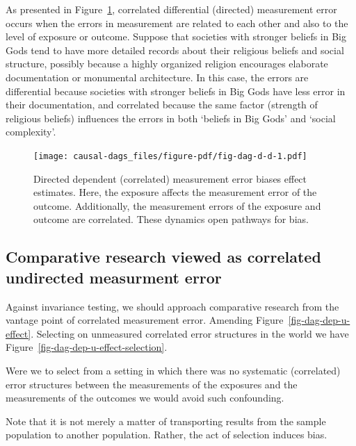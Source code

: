 \documentclass[
  singlecolumn]{report}
\begin{document}
As presented in Figure~\ref{fig-dag-d-d}, correlated differential
(directed) measurement error occurs when the errors in measurement are
related to each other and also to the level of exposure or outcome.
Suppose that societies with stronger beliefs in Big Gods tend to have
more detailed records about their religious beliefs and social
structure, possibly because a highly organized religion encourages
elaborate documentation or monumental architecture. In this case, the
errors are differential because societies with stronger beliefs in Big
Gods have less error in their documentation, and correlated because the
same factor (strength of religious beliefs) influences the errors in
both `beliefs in Big Gods' and `social complexity'.

\begin{figure}

{\centering \texttt{[image: causal-dags\_files/figure-pdf/fig-dag-d-d-1.pdf]}

}

\caption{\label{fig-dag-d-d}Directed dependent (correlated) measurement
error biases effect estimates. Here, the exposure affects the
measurement error of the outcome. Additionally, the measurement errors
of the exposure and outcome are correlated. These dynamics open pathways
for bias.}

\end{figure}

\hypertarget{comparative-research-viewed-as-correlated-undirected-measurment-error}{%
\subsection{Comparative research viewed as correlated undirected
measurment
error}\label{comparative-research-viewed-as-correlated-undirected-measurment-error}}

Against invariance testing, we should approach comparative research from
the vantage point of correlated measurement error. Amending
Figure~\ref{fig-dag-dep-u-effect}. Selecting on unmeasured correlated
error structures in the world we have
Figure~\ref{fig-dag-dep-u-effect-selection}.

Were we to select from a setting in which there was no systematic
(correlated) error structures between the measurements of the exposures
and the measurements of the outcomes we would avoid such confounding.

Note that it is not merely a matter of transporting results from the
sample population to another population. Rather, the act of selection
induces bias.
\end{document}
